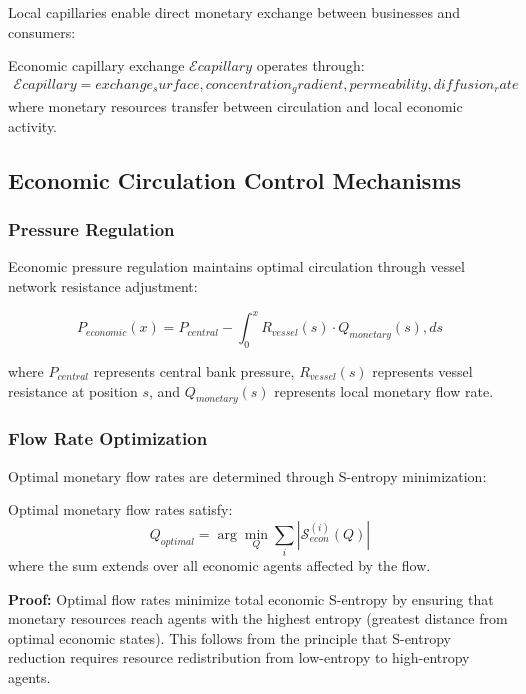 Local capillaries enable direct monetary exchange between businesses and consumers:

\begin{definition}
Economic capillary exchange $\mathcal{E}{capillary}$ operates through:
\begin{align}
\mathcal{E}{capillary} = {exchange_surface, concentration_gradient, permeability, diffusion_rate}
\end{align}
where monetary resources transfer between circulation and local economic activity.
\end{definition}

\subsection{Economic Circulation Control Mechanisms}

\subsubsection{Pressure Regulation}

Economic pressure regulation maintains optimal circulation through vessel network resistance adjustment:

\begin{equation}
P_{economic}(x) = P_{central} - \int_0^x R_{vessel}(s) \cdot Q_{monetary}(s) , ds
\end{equation}

where $P_{central}$ represents central bank pressure, $R_{vessel}(s)$ represents vessel resistance at position $s$, and $Q_{monetary}(s)$ represents local monetary flow rate.

\subsubsection{Flow Rate Optimization}

Optimal monetary flow rates are determined through S-entropy minimization:

\begin{theorem}
Optimal monetary flow rates satisfy:
\begin{equation}
Q_{optimal} = \arg\min_Q \sum_{i} |\mathcal{S}_{econ}^{(i)}(Q)|
\end{equation}
where the sum extends over all economic agents affected by the flow.

\textbf{Proof:}
Optimal flow rates minimize total economic S-entropy by ensuring that monetary resources reach agents with the highest entropy (greatest distance from optimal economic states). This follows from the principle that S-entropy reduction requires resource redistribution from low-entropy to high-entropy agents.
\end{theorem}

